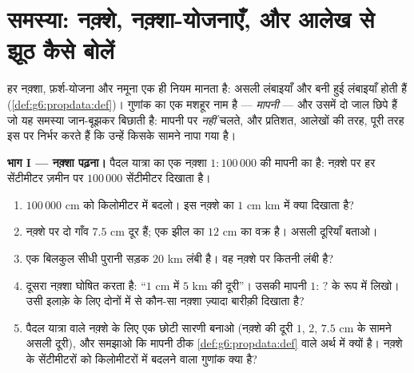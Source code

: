 \section{समस्या: नक़्शे, नक़्शा-योजनाएँ, और आलेख से झूठ कैसे बोलें}

\begin{problem}
\label{pb:g6:propdata:1}
हर नक़्शा, फ़र्श-योजना और नमूना एक ही नियम मानता है: असली
लंबाइयाँ और बनी हुई लंबाइयाँ \emph{} होती हैं
(\cref{def:g6:propdata:def})। गुणांक का एक मशहूर नाम है ---
\emph{मापनी} --- और उसमें दो जाल छिपे हैं जो यह
समस्या जान-बूझकर बिछाती है:  मापनी पर \emph{नहीं}
चलते, और प्रतिशत, आलेखों की तरह, पूरी तरह इस पर निर्भर करते हैं
कि उन्हें किसके सामने नापा गया है।

\medskip
\noindent\textbf{भाग I --- नक़्शा पढ़ना।}
पैदल यात्रा का एक नक़्शा $1:100\,000$ की मापनी का है: नक़्शे पर हर
सेंटीमीटर ज़मीन पर $100\,000$ सेंटीमीटर दिखाता है।
\begin{enumerate}
  \item $100\,000$ cm को किलोमीटर में बदलो। इस नक़्शे का $1$ cm
        km में क्या दिखाता है?
  \item नक़्शे पर दो गाँव $7.5$ cm दूर हैं; एक झील का 
        $12$ cm का वक्र है। असली दूरियाँ बताओ।
  \item एक बिलकुल सीधी पुरानी सड़क $20$ km लंबी है। वह नक़्शे पर
        कितनी लंबी है?
  \item दूसरा नक़्शा घोषित करता है: ``$1$ cm में $5$ km की दूरी''। उसकी
        मापनी $1: \,?$ के रूप में लिखो। उसी इलाक़े के लिए दोनों
        में से कौन-सा नक़्शा ज़्यादा बारीक़ी दिखाता है?
  \item पैदल यात्रा वाले नक़्शे के लिए एक छोटी सारणी बनाओ (नक़्शे
        की दूरी $1$, $2$, $7.5$ cm के सामने असली दूरी), और
        समझाओ कि मापनी ठीक \cref{def:g6:propdata:def} वाले अर्थ
        में  क्यों है। नक़्शे के सेंटीमीटरों को
        किलोमीटरों में बदलने वाला गुणांक क्या है?
\end{enumerate}


\end{problem}
